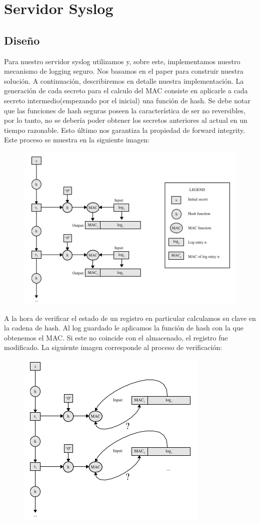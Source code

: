 \section{Servidor Syslog}
\subsection{Diseño}
Para nuestro servidor syslog utilizamos \cite{bio6} y, sobre este, implementamos nuestro 
mecanismo de logging seguro. Nos basamos en el paper \cite{bio2} para construir nuestra solución. A continuación, describiremos en detalle nuestra implementación.
La generación de cada secreto para el calculo del MAC consiste en aplicarle a cada secreto intermedio(empezando por el inicial) una función de hash. Se debe notar que las funciones de hash seguras poseen la característica de ser no reversibles, por lo tanto, no se debería poder obtener los secretos anteriores al actual en un tiempo razonable. Esto último nos garantiza la propiedad de forward integrity. Este proceso se muestra en la siguiente imagen:
\begin{figure}[H]
\centering
\includegraphics[scale=1]{imagenes/MAC.png}
\end{figure}
A la hora de verificar el estado de un registro en particular calculamos su clave en la cadena de hash.
Al log guardado le aplicamos la función de hash con la que obtenemos el MAC. Si este no coincide con el almacenado,
el registro fue modificado. La siguiente imagen corresponde al proceso de verificación:
\begin{figure}[H]
\centering
\includegraphics[scale=1]{imagenes/Verification.png}
\end{figure}
